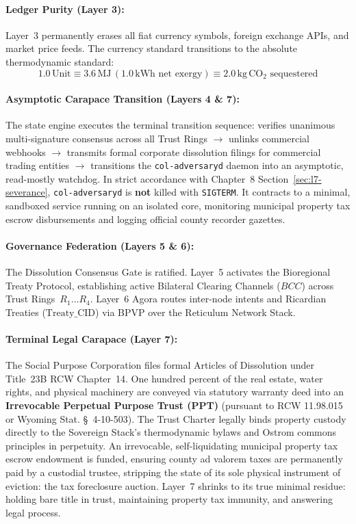 \paragraph{Ledger Purity (Layer 3):} Layer~3 permanently erases all fiat currency symbols, foreign exchange APIs, and market price feeds. The currency standard transitions to the absolute thermodynamic standard:
\begin{equation}
1.0\,\mathrm{Unit} \equiv 3.6\,\mathrm{MJ}\,(1.0\,\mathrm{kWh}\mbox{ net exergy}) \equiv 2.0\,\mathrm{kg}\,\mathrm{CO}_2\mbox{ sequestered}
\label{eq:thermo_unit}
\end{equation}
\paragraph{Asymptotic Carapace Transition (Layers 4 \& 7):} The state engine executes the terminal transition sequence: verifies unanimous multi-signature consensus across all Trust Rings $\to$ unlinks commercial webhooks $\to$ transmits formal corporate dissolution filings for commercial trading entities $\to$ transitions the \texttt{col-adversaryd} daemon into an asymptotic, read-mostly watchdog. In strict accordance with Chapter~8 Section~\ref{sec:l7-severance}, \texttt{col-adversaryd} is \textbf{not} killed with \texttt{SIGTERM}. It contracts to a minimal, sandboxed service running on an isolated core, monitoring municipal property tax escrow disbursements and logging official county recorder gazettes.
\paragraph{Governance Federation (Layers 5 \& 6):} The Dissolution Consensus Gate is ratified. Layer~5 activates the Bioregional Treaty Protocol, establishing active Bilateral Clearing Channels ($BCC$) across Trust Rings~$R_1 \dots R_4$. Layer~6 Agora routes inter-node intents and Ricardian Treaties ($\mathrm{Treaty\_CID}$) via BPVP over the Reticulum Network Stack.
\paragraph{Terminal Legal Carapace (Layer 7):} The Social Purpose Corporation files formal Articles of Dissolution under Title~23B RCW Chapter~14. One hundred percent of the real estate, water rights, and physical machinery are conveyed via statutory warranty deed into an \textbf{Irrevocable Perpetual Purpose Trust (PPT)} (pursuant to RCW 11.98.015 or Wyoming Stat. \S~4-10-503). The Trust Charter legally binds property custody directly to the Sovereign Stack's thermodynamic bylaws and Ostrom commons principles in perpetuity. An irrevocable, self-liquidating municipal property tax escrow endowment is funded, ensuring county ad valorem taxes are permanently paid by a custodial trustee, stripping the state of its sole physical instrument of eviction: the tax foreclosure auction. Layer~7 shrinks to its true minimal residue: holding bare title in trust, maintaining property tax immunity, and answering legal process.

